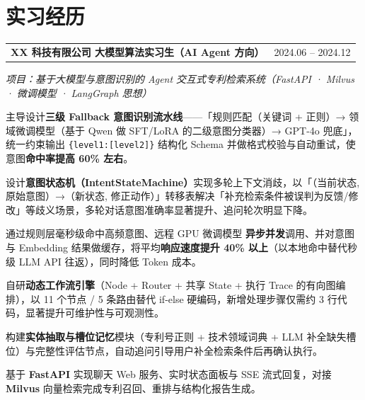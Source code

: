 \documentclass[9pt,a4paper]{article}
\makeatletter
\newcommand{\entry}[2]{%
  \par\vspace{2pt}%
  \begin{tabularx}{\textwidth}{@{}X@{}r@{}}
    \textbf{#1} & {\color{rulegray}\small #2}
  \end{tabularx}%
  \par}
\newcommand{\subentry}[1]{{\color{accent}\small\itshape #1}\par\vspace{1pt}}
\makeatother
\begin{document}
\section{实习经历}
\entry{XX 科技有限公司 \quad 大模型算法实习生（AI Agent 方向）}{2024.06 -- 2024.12}
\subentry{项目：基于大模型与意图识别的 Agent 交互式专利检索系统（FastAPI · Milvus · 微调模型 · LangGraph 思想）}
\begin{tight}
  \item 主导设计\textbf{三级 Fallback 意图识别流水线}——「规则匹配（关键词 + 正则）→ 领域微调模型（基于 Qwen 做 SFT/LoRA 的二级意图分类器）→ GPT-4o 兜底」，统一约束输出 \texttt{\{level1:[level2]\}} 结构化 Schema 并做格式校验与自动重试，使意图\textbf{命中率提高 60\% 左右}。
  \item 设计\textbf{意图状态机（IntentStateMachine）}实现多轮上下文消歧，以「（当前状态, 原始意图）→（新状态, 修正动作）」转移表解决「补充检索条件被误判为反馈/修改」等歧义场景，多轮对话意图准确率显著提升、追问轮次明显下降。
  \item 通过规则层毫秒级命中高频意图、远程 GPU 微调模型 \textbf{异步并发}调用、并对意图与 Embedding 结果做缓存，将平均\textbf{响应速度提升 40\% 以上}（以本地命中替代秒级 LLM API 往返），同时降低 Token 成本。
  \item 自研\textbf{动态工作流引擎}（Node + Router + 共享 State + 执行 Trace 的有向图编排），以 11 个节点 / 5 条路由替代 if-else 硬编码，新增处理步骤仅需约 3 行代码，显著提升可维护性与可观测性。
  \item 构建\textbf{实体抽取与槽位记忆}模块（专利号正则 + 技术领域词典 + LLM 补全缺失槽位）与完整性评估节点，自动追问引导用户补全检索条件后再确认执行。
  \item 基于 \textbf{FastAPI} 实现聊天 Web 服务、实时状态面板与 SSE 流式回复，对接 \textbf{Milvus} 向量检索完成专利召回、重排与结构化报告生成。
\end{tight}

\end{document}
